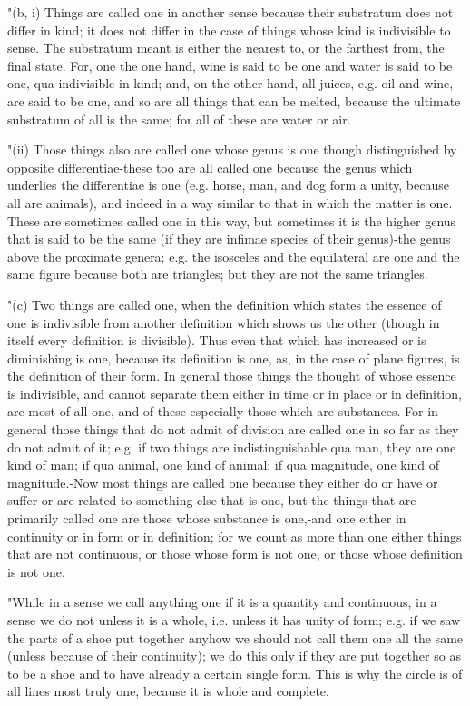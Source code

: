 "(b, i) Things are called one in another sense because their substratum
does not differ in kind; it does not differ in the case of things
whose kind is indivisible to sense. The substratum meant is either
the nearest to, or the farthest from, the final state. For, one the
one hand, wine is said to be one and water is said to be one, qua
indivisible in kind; and, on the other hand, all juices, e.g. oil
and wine, are said to be one, and so are all things that can be melted,
because the ultimate substratum of all is the same; for all of these
are water or air. 

"(ii) Those things also are called one whose genus is one though distinguished
by opposite differentiae-these too are all called one because the
genus which underlies the differentiae is one (e.g. horse, man, and
dog form a unity, because all are animals), and indeed in a way similar
to that in which the matter is one. These are sometimes called one
in this way, but sometimes it is the higher genus that is said to
be the same (if they are infimae species of their genus)-the genus
above the proximate genera; e.g. the isosceles and the equilateral
are one and the same figure because both are triangles; but they are
not the same triangles. 

"(c) Two things are called one, when the definition which states the
essence of one is indivisible from another definition which shows
us the other (though in itself every definition is divisible). Thus
even that which has increased or is diminishing is one, because its
definition is one, as, in the case of plane figures, is the definition
of their form. In general those things the thought of whose essence
is indivisible, and cannot separate them either in time or in place
or in definition, are most of all one, and of these especially those
which are substances. For in general those things that do not admit
of division are called one in so far as they do not admit of it; e.g.
if two things are indistinguishable qua man, they are one kind of
man; if qua animal, one kind of animal; if qua magnitude, one kind
of magnitude.-Now most things are called one because they either do
or have or suffer or are related to something else that is one, but
the things that are primarily called one are those whose substance
is one,-and one either in continuity or in form or in definition;
for we count as more than one either things that are not continuous,
or those whose form is not one, or those whose definition is not one.

"While in a sense we call anything one if it is a quantity and continuous,
in a sense we do not unless it is a whole, i.e. unless it has unity
of form; e.g. if we saw the parts of a shoe put together anyhow we
should not call them one all the same (unless because of their continuity);
we do this only if they are put together so as to be a shoe and to
have already a certain single form. This is why the circle is of all
lines most truly one, because it is whole and complete. 

